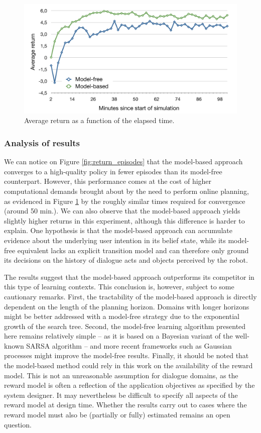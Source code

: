 \begin{figure}[p]
\centering
\includegraphics[scale=0.42]{imgs/timing.pdf}
\caption{Average return as a function of the elapsed time.}
\label{fig:return_time}
\end{figure}

\subsubsection*{Analysis of results}

We can notice on Figure \ref{fig:return_episodes} that the model-based approach converges to a high-quality policy in fewer episodes than its model-free counterpart.  However, this performance comes at the cost of higher computational demands brought about by the need to perform online planning, as evidenced in Figure \ref{fig:return_time} by the roughly similar times required for convergence (around 50 min.). We can also observe that the model-based approach yields slightly higher returns in this experiment, although this difference is harder to explain.  One hypothesis is that the model-based approach can accumulate evidence about the underlying user intention in its belief state, while its model-free equivalent lacks an explicit transition model and can therefore only ground its decisions on the history of dialogue acts and objects perceived by the robot.

The results suggest that the model-based approach outperforms its competitor in this type of learning contexts. This conclusion is, however, subject to some cautionary remarks.   First, the tractability of the model-based approach is directly dependent on the length of the planning horizon. Domains with longer horizons might be better addressed with a model-free strategy due to the exponential growth of the search tree. Second, the model-free learning algorithm presented here remains relatively simple -- as it is based on a Bayesian variant of the well-known SARSA algorithm -- and more recent frameworks such as Gaussian processes \citep{milica2013} might improve the model-free results. Finally, it should be noted that the model-based method could rely in this work on the availability of the reward model. This is not an unreasonable assumption for dialogue domains, as the reward model is often a reflection of the application objectives as specified by the system designer. It may nevertheless be difficult to specify all aspects of the reward model at design time. Whether the results carry out to cases where the reward model must also be (partially or fully) estimated remains an open question.

